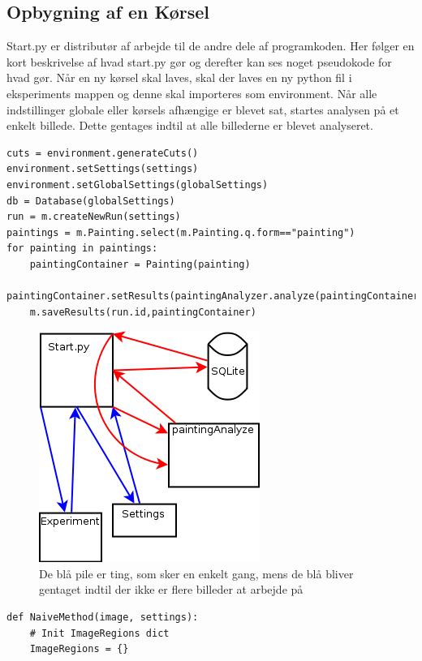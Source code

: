 {
\subsection{Opbygning af en Kørsel}
Start.py er distributør af arbejde til de andre dele af programkoden.
Her følger en kort beskrivelse af hvad start.py gør og derefter kan ses
noget pseudokode for hvad gør.
Når en ny kørsel skal laves, skal der laves en ny python fil i
eksperiments mappen og denne skal importeres som environment.
Når alle indstillinger globale eller kørsels afhængige er blevet sat,
startes analysen på et enkelt billede. Dette gentages indtil at alle
billederne er blevet analyseret.

\begin{lstlisting}
cuts = environment.generateCuts()
environment.setSettings(settings)
environment.setGlobalSettings(globalSettings)
db = Database(globalSettings)
run = m.createNewRun(settings)
paintings = m.Painting.select(m.Painting.q.form=="painting")
for painting in paintings:
	paintingContainer = Painting(painting)
	paintingContainer.setResults(paintingAnalyzer.analyze(paintingContainer,settings))
	m.saveResults(run.id,paintingContainer)
\end{lstlisting}
\begin{figure}[h!]
	\begin{center}
		\includegraphics[scale=0.5]{afsnit/implementation/billeder/workflow_start_py.png}
	\end{center}
	\caption{De blå pile er ting, som sker en enkelt gang, mens de blå
	bliver gentaget indtil der ikke er flere billeder at arbejde på}
\end{figure}

\begin{lstlisting}[caption={Pseudokode for den naive metode},
    captionpos=b, label={pseudo_naiveMethod}, frame=tb,
    breaklines=false, float=h]
def NaiveMethod(image, settings):
    # Init ImageRegions dict
    ImageRegions = {}


\end{lstlisting}}
